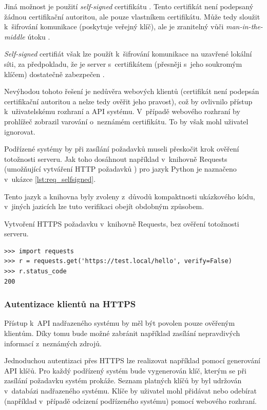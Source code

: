 Jiná možnost je použití \textit{self-signed} certifikátu \cite{cert_wallen}. Tento certifikát není podepsaný žádnou certifikační autoritou, ale pouze vlastníkem certifikátu. Může tedy sloužit k~šifrování komunikace (poskytuje veřejný klíč), ale je zranitelný vůči \textit{man-in-the-middle} útoku \cite{cert_wallen}.

\textit{Self-signed} certifiát však lze použít k~šifrování komunikace na uzavřené lokální síti, za předpokladu, že je server s~certifikátem (přesněji s~jeho soukromým klíčem) dostatečně zabezpečen \cite{cert_wallen}. 

Nevýhodou tohoto řešení je nedůvěra webových klientů (certifikát není podepsán certifikační autoritou a nelze tedy ověřit jeho pravost), což by ovlivnilo přístup k~uživatelskému rozhraní a API systému. V~případě webového rozhraní by prohlížeč zobrazil varování o~neznámém certifikátu. To by však mohl uživatel ignorovat. 

Podřízené systémy by při zasílání požadavků museli přeskočit krok ověření totožnosti serveru. Jak toho dosáhnout například v~knihovně Requests (umožňující vytváření HTTP požadavků \cite{requests}) pro jazyk Python \cite{python_tutorial} je naznačeno v~ukázce \ref{lst:req_selfsigned}. 

Tento jazyk a knihovna byly zvoleny z~důvodů kompaktnosti ukázkového kódu, v~jiných jazicích lze tuto verifikaci obejít obdobným způsobem.

\begin{listing}[htbp]
\caption{\label{lst:req_selfsigned} Vytvoření HTTPS požadavku v~knihovně Requests, bez ověření totožnosti serveru.}
\begin{verbatim}
>>> import requests
>>> r = requests.get('https://test.local/hello', verify=False)
>>> r.status_code
200
\end{verbatim}
\end{listing}

\subsubsection{Autentizace klientů na HTTPS}

Přístup k~API nadřazeného systému by měl být povolen pouze ověřeným klientům. Díky tomu bude možné zabránit například zasílání nepravdivých informací z~neznámých zdrojů.

Jednoduchou autentizaci přes HTTPS lze realizovat například pomocí generování API klíčů. Pro každý podřízený systém bude vygenerován klíč, kterým se při zasílání požadavku systém prokáže. Seznam platných klíčů by byl udržován v~databázi nadřazeného systému. Klíče by uživatel mohl přidávat nebo odebírat (například v~případě odcizení podřízeného systému) pomocí webového rozhraní.

